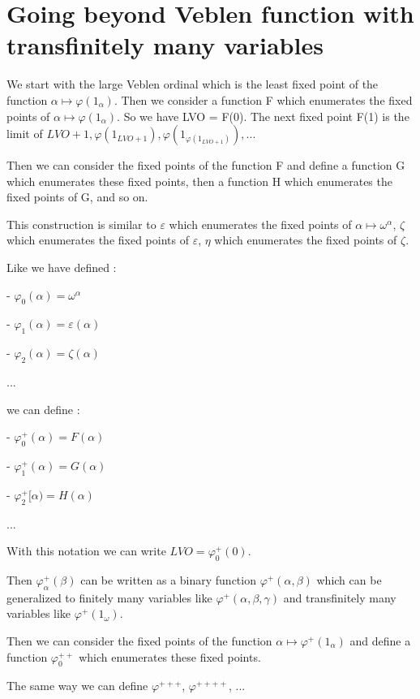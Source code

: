 \documentclass[10pt]{article}
\begin{document}
\section{Going beyond Veblen function with transfinitely many variables}


We start with the large Veblen ordinal which is the least fixed point of the function \( \alpha \mapsto \varphi(1_\alpha) \). Then we consider a function F which enumerates the fixed points of \( \alpha \mapsto \varphi(1_\alpha) \). So we have LVO = F(0). The next fixed point F(1) is the limit of \( LVO+1, \varphi(1_{LVO+1}), \varphi(1_{\varphi(1_{LVO+1})}), ... \)

Then we can consider the fixed points of the function F and define a function G which enumerates these fixed points, then a function H which enumerates the fixed points of G, and so on.

This construction is similar to \( \varepsilon \) which enumerates the fixed points of \( \alpha \mapsto \omega^\alpha \), \( \zeta \) which enumerates the fixed points of \( \varepsilon \), \( \eta \) which enumerates the fixed points of \( \zeta \).

Like we have defined :

 - \( \varphi_0(\alpha) = \omega^\alpha \)

 - \( \varphi_1(\alpha) = \varepsilon(\alpha) \)

 - \( \varphi_2(\alpha) = \zeta(\alpha) \)

...

we can define :

 - \( \varphi^+_0(\alpha) = F(\alpha) \)

 - \( \varphi^+_1(\alpha) = G(\alpha) \)

 - \( \varphi^+_2[\alpha) = H(\alpha) \)

 ...

With this notation we can write \( LVO = \varphi^+_0(0) \).

Then \( \varphi^+_\alpha(\beta) \) can be written as a binary function \( \varphi^+(\alpha,\beta) \) which can be generalized to finitely many variables like \( \varphi^+(\alpha,\beta,\gamma) \) and transfinitely many variables like \( \varphi^+(1_\omega) \).

Then we can consider the fixed points of the function \( \alpha \mapsto \varphi^+(1_\alpha) \) and define a function \( \varphi^{++}_0 \) which enumerates these fixed points.

The same way we can define \( \varphi^{+++} \), \( \varphi^{++++} \), ...
\end{document}
